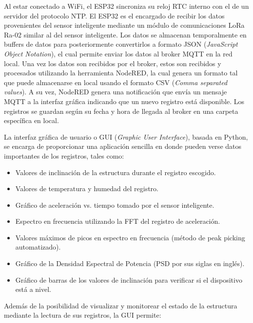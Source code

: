 Al estar conectado a WiFi, el ESP32 sincroniza su reloj RTC interno con el de un servidor del protocolo NTP. El ESP32 es el encargado de recibir los datos provenientes del sensor inteligente mediante un módulo de comunicaciones LoRa Ra-02 similar al del sensor inteligente. Los datos se almacenan temporalmente en buffers de datos para posteriormente convertirlos a formato JSON (\textit{JavaScript Object Notation}), el cual permite enviar los datos al broker MQTT en la red local. Una vez los datos son recibidos por el broker, estos son recibidos y procesados utilizando la herramienta NodeRED, la cual genera un formato tal que puede almacenarse en local usando el formato CSV (\textit{Comma separated values}). A su vez, NodeRED genera una notificación que envía un mensaje MQTT a la interfaz gráfica indicando que un nuevo registro está disponible. Los registros se guardan según su fecha y hora de llegada al broker en una carpeta específica en local.

La interfaz gráfica de usuario o GUI (\textit{Graphic User Interface}), basada en Python, se encarga de proporcionar una aplicación sencilla en donde pueden verse datos importantes de los registros, tales como:

\begin{itemize}
    \item Valores de inclinación de la estructura durante el registro escogido.
    \item Valores de temperatura y humedad del registro.
    \item Gráfico de aceleración vs. tiempo tomado por el sensor inteligente.
    \item Espectro en frecuencia utilizando la FFT del registro de aceleración.
    \item Valores máximos de picos en espectro en frecuencia (método de peak picking automatizado).
    \item Gráfico de la Densidad Espectral de Potencia (PSD por sus siglas en inglés).
    \item Gráfico de barras de los valores de inclinación para verificar si el dispositivo está a nivel.
\end{itemize}

Además de la posibilidad de visualizar y monitorear el estado de la estructura mediante la lectura de sus registros, la GUI permite:

